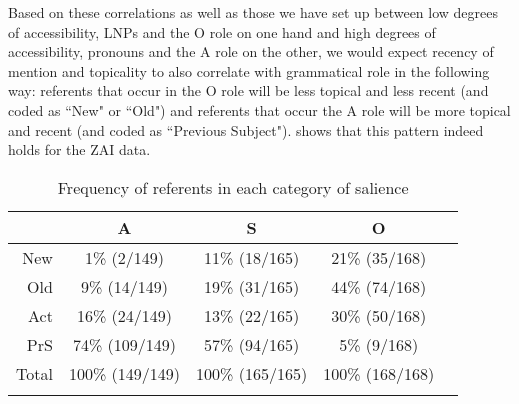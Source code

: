 Based on these correlations as well as those we have set up between low degrees of accessibility, LNPs and the O role on one hand and high degrees of accessibility, pronouns and the A role on the other, we would expect recency of mention and topicality to also correlate with grammatical role in the following way: referents that occur in the O role will be less topical and less recent (and coded as ``New" or ``Old") and referents that occur the A role will be more topical and recent (and coded as ``Previous Subject").  shows that this pattern indeed holds for the ZAI data.
\begin{table}

\caption{{Frequency of referents in each category of salience}}
\begin{tabular}{ r  c  c  c  c }
\lsptoprule
  & \textsc{A} & \textsc{S} & \textsc{O} \\

\midrule 
 New & 1{\%} (2/149) & 11{\%} (18/165) & 21{\%} (35/168)   \\

 Old & 9{\%} (14/149) & 19{\%} (31/165) & 44{\%} (74/168)  \\

  Act & 16{\%} (24/149) & 13{\%} (22/165) & 30{\%} (50/168)  \\

 PrS & 74{\%} (109/149) & 57{\%} (94/165) & 5{\%} (9/168) \\

\midrule
 Total& 100{\%} (149/149)  & 100{\%} (165/165)  &  100{\%} (168/168)\\

\lspbottomrule
\end{tabular}\\
\label{totalsalience1}

\end{table}


